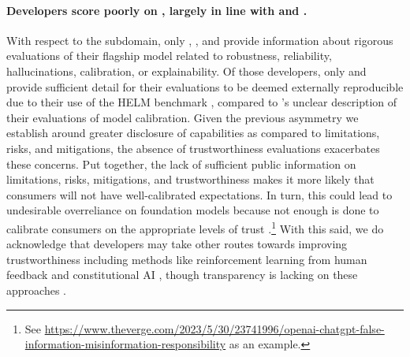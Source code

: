 \documentclass[screen, authorversion, acmsmall]{acmart}
\begin{document}
\paragraph{Developers score poorly on \trustworthiness, largely in line with \risks and \modelmitigations.}
With respect to the \trustworthiness subdomain, only \openai, \cohere, and \aitwentyone provide information about rigorous evaluations of their flagship model related to robustness, reliability, hallucinations, calibration, or explainability.
Of those developers, only \cohere and \aitwentyone provide sufficient detail for their evaluations to be deemed externally reproducible due to their use of the HELM benchmark \citep{liang2023holistic}, compared to \openai's unclear description of their evaluations of model calibration.
Given the previous asymmetry we establish around greater disclosure of capabilities as compared to limitations, risks, and mitigations, the absence of trustworthiness evaluations exacerbates these concerns.
Put together, the lack of sufficient public information on limitations, risks, mitigations, and trustworthiness makes it more likely that consumers will not have well-calibrated expectations.
In turn, this could lead to undesirable overreliance on foundation models because not enough is done to calibrate consumers on the appropriate levels of trust \citep{parasuraman2010complacency}.\footnote{See \url{https://www.theverge.com/2023/5/30/23741996/openai-chatgpt-false-information-misinformation-responsibility} as an example.}
With this said, we do acknowledge that developers may take other routes towards improving trustworthiness including methods like reinforcement learning from human feedback \citep[RLHF;]{ziegler2019finetuning, ouyang2022instructions} and constitutional AI \citep{bai2022constitutional}, though transparency is lacking on these approaches \citep{casper2023open}.
\end{document}
